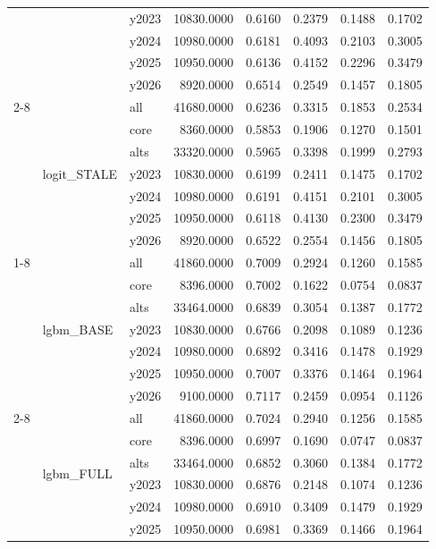 \begin{tabular}{lllrrrrr}
 &  & y2023 & 10830.0000 & 0.6160 & 0.2379 & 0.1488 & 0.1702 \\
 &  & y2024 & 10980.0000 & 0.6181 & 0.4093 & 0.2103 & 0.3005 \\
 &  & y2025 & 10950.0000 & 0.6136 & 0.4152 & 0.2296 & 0.3479 \\
 &  & y2026 & 8920.0000 & 0.6514 & 0.2549 & 0.1457 & 0.1805 \\
\cline{2-8}
 & \multirow[t]{7}{*}{logit_STALE} & all & 41680.0000 & 0.6236 & 0.3315 & 0.1853 & 0.2534 \\
 &  & core & 8360.0000 & 0.5853 & 0.1906 & 0.1270 & 0.1501 \\
 &  & alts & 33320.0000 & 0.5965 & 0.3398 & 0.1999 & 0.2793 \\
 &  & y2023 & 10830.0000 & 0.6199 & 0.2411 & 0.1475 & 0.1702 \\
 &  & y2024 & 10980.0000 & 0.6191 & 0.4151 & 0.2101 & 0.3005 \\
 &  & y2025 & 10950.0000 & 0.6118 & 0.4130 & 0.2300 & 0.3479 \\
 &  & y2026 & 8920.0000 & 0.6522 & 0.2554 & 0.1456 & 0.1805 \\
\cline{1-8} \cline{2-8}
\multirow[t]{42}{*}{dd5_24h} & \multirow[t]{7}{*}{lgbm_BASE} & all & 41860.0000 & 0.7009 & 0.2924 & 0.1260 & 0.1585 \\
 &  & core & 8396.0000 & 0.7002 & 0.1622 & 0.0754 & 0.0837 \\
 &  & alts & 33464.0000 & 0.6839 & 0.3054 & 0.1387 & 0.1772 \\
 &  & y2023 & 10830.0000 & 0.6766 & 0.2098 & 0.1089 & 0.1236 \\
 &  & y2024 & 10980.0000 & 0.6892 & 0.3416 & 0.1478 & 0.1929 \\
 &  & y2025 & 10950.0000 & 0.7007 & 0.3376 & 0.1464 & 0.1964 \\
 &  & y2026 & 9100.0000 & 0.7117 & 0.2459 & 0.0954 & 0.1126 \\
\cline{2-8}
 & \multirow[t]{7}{*}{lgbm_FULL} & all & 41860.0000 & 0.7024 & 0.2940 & 0.1256 & 0.1585 \\
 &  & core & 8396.0000 & 0.6997 & 0.1690 & 0.0747 & 0.0837 \\
 &  & alts & 33464.0000 & 0.6852 & 0.3060 & 0.1384 & 0.1772 \\
 &  & y2023 & 10830.0000 & 0.6876 & 0.2148 & 0.1074 & 0.1236 \\
 &  & y2024 & 10980.0000 & 0.6910 & 0.3409 & 0.1479 & 0.1929 \\
 &  & y2025 & 10950.0000 & 0.6981 & 0.3369 & 0.1466 & 0.1964 \\

\end{tabular}
